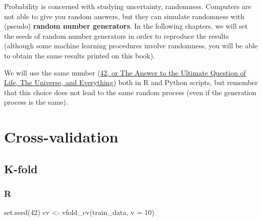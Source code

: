 \documentclass[
  letterpaper,
  DIV=11,
  numbers=noendperiod]{scrreprt}
\newenvironment{Shaded}{\begin{snugshade}}{\end{snugshade}}
\newcommand{\AttributeTok}[1]{\textcolor[rgb]{0.40,0.46,0.14}{#1}}
\newcommand{\DecValTok}[1]{\textcolor[rgb]{0.68,0.00,0.00}{#1}}
\newcommand{\FunctionTok}[1]{\textcolor[rgb]{0.28,0.35,0.67}{#1}}
\newcommand{\NormalTok}[1]{\textcolor[rgb]{0.00,0.46,0.62}{#1}}
\newcommand{\OtherTok}[1]{\textcolor[rgb]{0.00,0.46,0.62}{#1}}
\begin{document}
\begin{tcolorbox}[standard jigsaw,bottomtitle=1mm, opacitybacktitle=0.6, coltitle=black, colback=white, arc=.35mm, leftrule=.75mm, titlerule=0mm, rightrule=.15mm, opacityback=0, colframe=quarto-callout-warning-color-frame, title=\textcolor{quarto-callout-warning-color}{\faExclamationTriangle}\hspace{0.5em}{Pseudo-random number generators}, toprule=.15mm, colbacktitle=quarto-callout-warning-color!10!white, bottomrule=.15mm, toptitle=1mm, left=2mm]
Probability is concerned with studying uncertainty, randomness.
Computers are not able to give you random answers, but they can simulate
randomness with (pseudo) \textbf{random number generators}. In the
following chapters, we will set the seeds of random number generators in
order to reproduce the results (although some machine learning
procedures involve randomness, you will be able to obtain the same
results printed on this book).

We will use the same number
(\href{https://en.wikipedia.org/wiki/The_Hitchhiker\%27s_Guide_to_the_Galaxy\#42,_or_The_Answer_to_the_Ultimate_Question_of_Life,_The_Universe,_and_Everything}{42,
or The Answer to the Ultimate Question of Life, The Universe, and
Everything}) both in R and Python scripts, but remember that this choice
does not lead to the same random process (even if the generation process
is the same).
\end{tcolorbox}

\hypertarget{cross-validation}{%
\section{Cross-validation}\label{cross-validation}}

\hypertarget{k-fold}{%
\subsection{K-fold}\label{k-fold}}

\hypertarget{r-53}{%
\subsubsection{R}\label{r-53}}

\begin{Shaded}
\begin{Highlighting}[]
\FunctionTok{set.seed}\NormalTok{(}\DecValTok{42}\NormalTok{)}
\NormalTok{cv }\OtherTok{\textless{}{-}} \FunctionTok{vfold\_cv}\NormalTok{(train\_data, }\AttributeTok{v =} \DecValTok{10}\NormalTok{)}
\end{Highlighting}
\end{Shaded}
\end{document}
